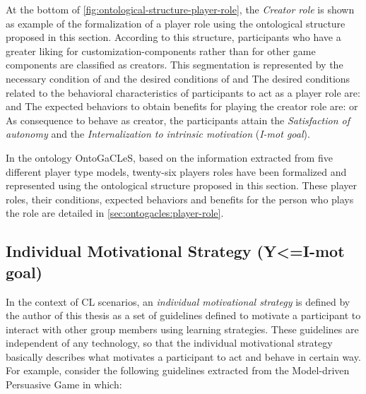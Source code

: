 At the bottom of \autoref{fig:ontological-structure-player-role}, the \emph{Creator role} is shown as example of the formalization of a player role using the ontological structure proposed in this section. According to this structure, participants who have a greater liking for customization-components rather than for other game components are classified as creators. This segmentation is represented by the necessary condition of  and the desired conditions of     and  The desired conditions related to the behavioral characteristics of participants to act as a player role are:  and  The expected behaviors to obtain benefits for playing the creator role are:        or  As consequence to behave as creator, the participants attain the \emph{Satisfaction of autonomy} and the \emph{Internalization to intrinsic motivation} (\emph{I-mot goal}).

In the ontology OntoGaCLeS, based on the information extracted from five different player type models, twenty-six players roles have been formalized and represented using the ontological structure proposed in this section. These player roles, their conditions, expected behaviors and benefits for the person who plays the role are detailed in \autoref{sec:ontogacles:player-role}.

\subsection{Individual Motivational Strategy (Y<=I-mot goal)}

In the context of CL scenarios, an \emph{individual motivational strategy} is defined by the author of this thesis as a set of guidelines defined to motivate a participant to interact with other group members using learning strategies. These guidelines are independent of any technology, so that the individual motivational strategy basically describes what motivates a participant to act and behave in certain way. For example, consider the following guidelines extracted from the Model-driven Persuasive Game in which:

